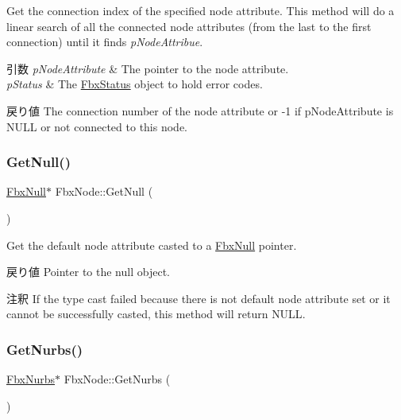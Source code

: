 Get the connection index of the specified node attribute. This method will do a linear search of all the connected node attributes (from the last to the first connection) until it finds {\itshape p\+Node\+Attribue}. 
\begin{DoxyParams}{引数}
{\em p\+Node\+Attribute} & The pointer to the node attribute. \\
\hline
{\em p\+Status} & The \hyperlink{class_fbx_status}{Fbx\+Status} object to hold error codes. \\
\hline
\end{DoxyParams}
\begin{DoxyReturn}{戻り値}
The connection number of the node attribute or {\ttfamily -\/1} if p\+Node\+Attribute is {\ttfamily N\+U\+LL} or not connected to this node. 
\end{DoxyReturn}
\mbox{\label{class_fbx_node_a2683facd88f4185a901adf108e672368}} 
\subsubsection{\texorpdfstring{Get\+Null()}{GetNull()}}
{\footnotesize\ttfamily \hyperlink{class_fbx_null}{Fbx\+Null}$\ast$ Fbx\+Node\+::\+Get\+Null (\begin{DoxyParamCaption}{ }\end{DoxyParamCaption})}

Get the default node attribute casted to a \hyperlink{class_fbx_null}{Fbx\+Null} pointer. \begin{DoxyReturn}{戻り値}
Pointer to the null object. 
\end{DoxyReturn}
\begin{DoxyRemark}{注釈}
If the type cast failed because there is not default node attribute set or it cannot be successfully casted, this method will return {\ttfamily N\+U\+LL}. 
\end{DoxyRemark}
\mbox{\label{class_fbx_node_adcf7d45de6929b0f9b71d1e302eb24da}} 
\subsubsection{\texorpdfstring{Get\+Nurbs()}{GetNurbs()}}
{\footnotesize\ttfamily \hyperlink{class_fbx_nurbs}{Fbx\+Nurbs}$\ast$ Fbx\+Node\+::\+Get\+Nurbs (\begin{DoxyParamCaption}{ }\end{DoxyParamCaption})}


